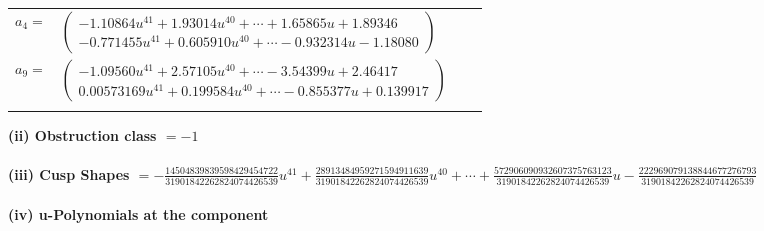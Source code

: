 \documentclass[1p]{elsarticle_modified}
\theoremstyle{definition}
\begin{document}
\begin{tabular}{m{7pt} m{180pt} m{7pt} m{180pt} }
\flushright $a_{4}=$&$\begin{pmatrix}-1.10864 u^{41}+1.93014 u^{40}+\cdots+1.65865 u+1.89346\\-0.771455 u^{41}+0.605910 u^{40}+\cdots-0.932314 u-1.18080\end{pmatrix}$ \\
\flushright $a_{9}=$&$\begin{pmatrix}-1.09560 u^{41}+2.57105 u^{40}+\cdots-3.54399 u+2.46417\\0.00573169 u^{41}+0.199584 u^{40}+\cdots-0.855377 u+0.139917\end{pmatrix}$\\&\end{tabular}
\flushleft \textbf{(ii) Obstruction class $= -1$}\\~\\
\flushleft \textbf{(iii) Cusp Shapes $= -\frac{14504839839598429454722}{31901842262824074426539} u^{41}+\frac{28913484959271594911639}{31901842262824074426539} u^{40}+\cdots+\frac{572906090932607375763123}{31901842262824074426539} u-\frac{222969079138844677276793}{31901842262824074426539}$}\\~\\
\newpage\renewcommand{\arraystretch}{1}
\flushleft \textbf{(iv) u-Polynomials at the component}\newline \\
\end{document}
